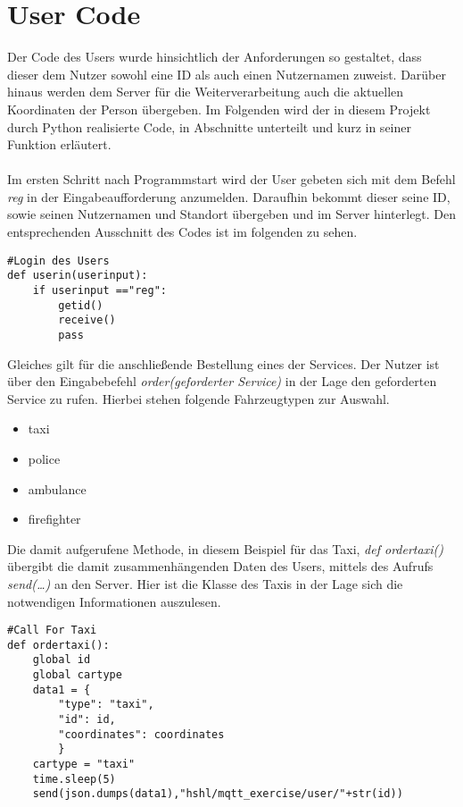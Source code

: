 \section{User Code}\label{usercode}
Der Code des Users wurde hinsichtlich der Anforderungen so gestaltet, dass dieser dem Nutzer sowohl eine ID als auch einen Nutzernamen zuweist. Darüber hinaus werden dem Server für die Weiterverarbeitung auch die aktuellen Koordinaten der Person übergeben. Im Folgenden wird der in diesem Projekt durch Python realisierte Code, in Abschnitte unterteilt und kurz in seiner Funktion erläutert.\\
\\
Im ersten Schritt nach Programmstart wird der User gebeten sich mit dem Befehl \textit{reg} in der Eingabeaufforderung anzumelden. Daraufhin bekommt dieser seine ID, sowie seinen Nutzernamen und Standort übergeben und im Server hinterlegt. Den entsprechenden Ausschnitt des Codes ist im folgenden zu sehen.

\begin{lstlisting}
#Login des Users
def userin(userinput):
    if userinput =="reg":
        getid()
        receive()
        pass
\end{lstlisting}

Gleiches gilt für die anschließende Bestellung eines der Services. Der Nutzer ist über den Eingabebefehl \textit{order(geforderter Service)} in der Lage den geforderten Service zu rufen. Hierbei stehen folgende Fahrzeugtypen zur Auswahl.

\begin{itemize}

	\item taxi
	\item police
	\item ambulance
	\item firefighter

\end{itemize}

Die damit aufgerufene Methode, in diesem Beispiel für das Taxi, \textit{def ordertaxi()} übergibt die damit zusammenhängenden Daten des Users, mittels des Aufrufs \textit{send(…)} an den Server.
Hier ist die Klasse des Taxis in der Lage sich die notwendigen Informationen auszulesen.

\begin{lstlisting}
#Call For Taxi
def ordertaxi():
    global id
    global cartype
    data1 = {
        "type": "taxi",
        "id": id,
        "coordinates": coordinates
        }
    cartype = "taxi"
    time.sleep(5)
    send(json.dumps(data1),"hshl/mqtt_exercise/user/"+str(id))
\end{lstlisting}

